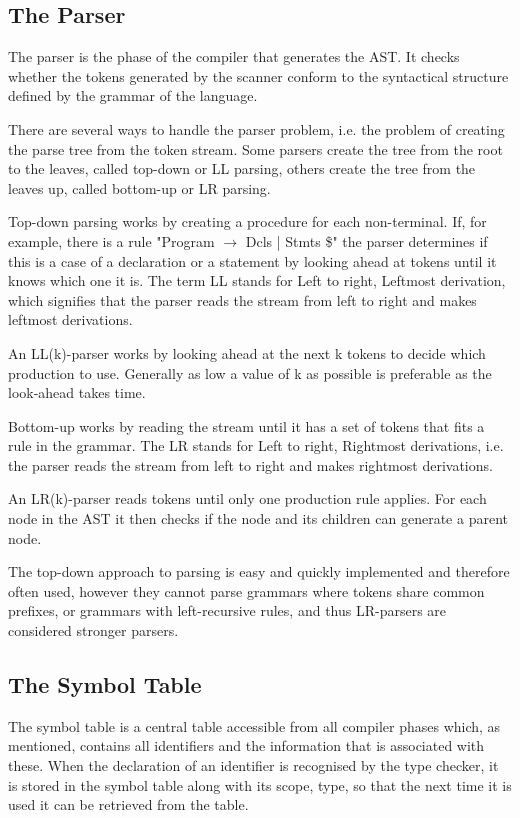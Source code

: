 \subsection{The Parser}

The parser is the phase of the compiler that generates the AST. It checks whether the tokens generated by the scanner conform to the syntactical structure defined by the grammar of the language. 

There are several ways to handle the parser problem, i.e. the problem of creating the parse tree from the token stream. Some parsers create the tree from the root to the leaves, called top-down or LL parsing, others create the tree from the leaves up, called bottom-up or LR parsing. 

Top-down parsing works by creating a procedure for each non-terminal. If, for example, there is a rule "Program $\rightarrow$ Dcls | Stmts \$" the parser determines if this is a case of a declaration or a statement by looking ahead at tokens until it knows which one it is. The term LL stands for Left to right, Leftmost derivation, which signifies that the parser reads the stream from left to right and makes leftmost derivations.

An LL(k)-parser works by looking ahead at the next k tokens to decide which production to use. Generally as low a value of k as possible is preferable as the look-ahead takes time. 

Bottom-up works by reading the stream until it has a set of tokens that fits a rule in the grammar. The LR stands for Left to right, Rightmost derivations, i.e. the parser reads the stream from left to right and makes rightmost derivations.

An LR(k)-parser reads tokens until only one production rule applies. For each node in the AST it then checks if the node and its children can generate a parent node.

The top-down approach to parsing is easy and quickly implemented and therefore often used, however they cannot parse grammars where tokens share common prefixes, or grammars with left-recursive rules, and thus LR-parsers are considered stronger parsers.

\subsection{The Symbol Table}

The symbol table is a central table accessible from all compiler phases which, as mentioned, contains all identifiers and the information that is associated with these. When the declaration of an identifier is recognised by the type checker, it is stored in the symbol table along with its scope, type, so that the next time it is used it can be retrieved from the table.

